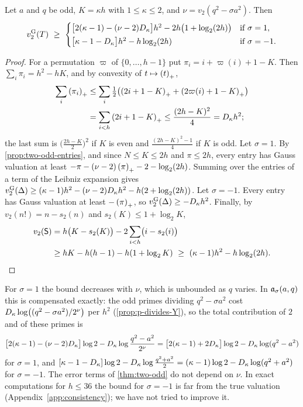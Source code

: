 \begin{theorem}\label{thm:two-odd}
Let $a$ and $q$ be odd, $K=\kappa h$ with $1\le\kappa\le2$, and $\nu=v_2(q^2-\sigma a^2)$. Then
\[
  v_{2}^{\mathrm{G}}(T)\ \ge\
  \begin{cases}\bigl[2(\kappa-1)-(\nu-2)D_\kappa\bigr]h^2-2h\bigl(1+\log_2(2h)\bigr)&\text{if }\sigma=1,\\[2pt]
  \bigl[\kappa-1-D_\kappa\bigr]h^2-h\log_2(2h)&\text{if }\sigma=-1.\end{cases}
\]
\end{theorem}

\begin{proof}
For a permutation $\varpi$ of $\{0,\dots,h-1\}$ put $\pi_i=i+\varpi(i)+1-K$. Then
$\sum_i\pi_i=h^2-hK$, and by convexity of $t\mapsto\left(t\right)_{+}$,
\begin{equation}\label{eq:convexity-sum}
  \begin{aligned}
  \sum_i\left(\pi_i\right)_{+}&\le\sum_i\tfrac12\bigl(\left(2i+1-K\right)_{+}+\left(2\varpi(i)+1-K\right)_{+}\bigr)\\
  &=\sum_{i<h}\left(2i+1-K\right)_{+}\le\frac{(2h-K)^2}{4}=D_\kappa h^2 ;\end{aligned}
\end{equation}
the last sum is $\bigl(\frac{2h-K}2\bigr)^2$ if $K$ is even and $\frac{(2h-K)^2-1}4$ if $K$ is
odd. Let $\sigma=1$. By \cref{prop:two-odd-entries}, and since $N\le K\le2h$ and $\pi\le2h$,
every entry has Gauss valuation at least $-\pi-(\nu-2)\left(\pi\right)_{+}-2-\log_2(2h)$. Summing over the
entries of a term of the Leibniz expansion gives
$v_{2}^{\mathrm{G}}(\Delta)\ge(\kappa-1)h^2-(\nu-2)D_\kappa h^2-h(2+\log_2(2h))$. Let $\sigma=-1$. Every entry has
Gauss valuation at least $-\left(\pi\right)_{+}$, so $v_{2}^{\mathrm{G}}(\Delta)\ge-D_\kappa h^2$. Finally, by
$v_2(n!)=n-s_2(n)$ and $s_2(K)\le1+\log_2K$,
\begin{align*}
  v_2(\nrm)&=h\bigl(K-s_2(K)\bigr)-2\sum_{i<h}\bigl(i-s_2(i)\bigr)\\
  &\ge hK-h(h-1)-h(1+\log_2K)\ \ge\ (\kappa-1)h^2-h\log_2(2h).\qedhere
\end{align*}
\end{proof}

\begin{remark}\label{rem:two-odd-cancellation}
For $\sigma=1$ the bound decreases with $\nu$, which is unbounded as $q$ varies. In
$\mathfrak{a}_\sigma(a,q)$ this is compensated exactly: the odd primes dividing $q^2-\sigma a^2$ cost
$D_\kappa\log\bigl((q^2-\sigma a^2)/2^\nu\bigr)$ per $h^2$ (\cref{prop:p-divides-Y}), so the total
contribution of $2$ and of these primes is
\[
  \bigl[2(\kappa-1)-(\nu-2)D_\kappa\bigr]\log2-D_\kappa\log\frac{q^2-a^2}{2^\nu}
  =\bigl[2(\kappa-1)+2D_\kappa\bigr]\log2-D_\kappa\log(q^2-a^2)
\]
for $\sigma=1$, and $[\kappa-1-D_\kappa]\log2-D_\kappa\log\frac{q^2+a^2}{2}=(\kappa-1)\log2-D_\kappa\log(q^2+a^2)$
for $\sigma=-1$. The error terms of \cref{thm:two-odd} do not depend on $\nu$. In exact
computations for $h\le36$ the bound for $\sigma=-1$ is far from the true valuation
(Appendix~\ref{app:consistency}); we have not tried to improve it.
\end{remark}

